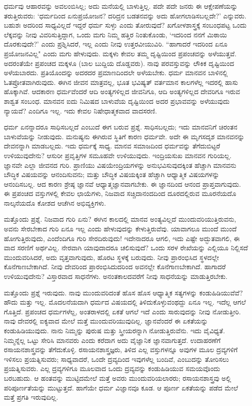 ಧರ್ಮವು ಆಹಾರವನ್ನು ಅವಲಂಬಿಸಿಲ್ಲ; ಅದು ಮನೆಯಲ್ಲಿ ಬಾಳುತ್ತಿಲ್ಲ. ಪದೇ ಪದೇ ಜನರು ಈ ಆಕ್ಷೇಪಣೆಯನ್ನು ತರುತ್ತಿರುವರು: `ಧರ್ಮದಿಂದ ಏನು\break ಪ್ರಯೋಜನ? ದರಿದ್ರನ ಬಡತನವನ್ನು ಅದು ಹೋಗಲಾಡಿಸಬಲ್ಲದೇ?' ಎನ್ನುವರು. ಬಹುಶಃ ಅದರಿಂದ ಸಾಧ್ಯವಿಲ್ಲದೆ ಇದ್ದರೆ ಧರ್ಮ ಸುಳ್ಳು ಎಂದು ತೋರುವುದೆ? ಖಗೋಳಶಾಸ್ತ್ರಕ್ಕೆ ಸಂಬಂಧಪಟ್ಟ ಒಂದು ಲೆಕ್ಕವನ್ನು ನೀವು ವಿವರಿಸುತ್ತಿದ್ದಾಗ, ಒಂದು ಮಗು ನಿಮ್ಮ ಹತ್ತಿರ ನಿಂತುಕೊಂಡು, `ಇದರಿಂದ ನನಗೆ ಮಿಠಾಯಿ ದೊರಕುವುದೇ?' ಎಂದು ಪ್ರಶ್ನಿಸಿದರೆ, ಇಲ್ಲ ಎಂದು ನೀವು ಉತ್ತರವೀಯುವಿರಿ. “ಹಾಗಾದರೆ ಇದರಿಂದ ಏನೂ ಪ್ರಯೋಜನವಿಲ್ಲ" ಎಂದು ಮಗು ಹೇಳುವುದು. ಮಕ್ಕಳು ಕೇವಲ ತಮ್ಮ ದೃಷ್ಟಿಯಿಂದ ಪ್ರಪಂಚವನ್ನು ಅಳೆಯುತ್ತವೆ. ಅದರಂತೆಯೇ ಪ್ರಪಂಚದ ಮಕ್ಕಳೂ (ಬಾಲ ಬುದ್ದಿಯ ದೊಡ್ಡವರು). ನಾವು ಪರವಸ್ತುವನ್ನು ಲೌಕಿಕ ದೃಷ್ಟಿಯಿಂದ ಅಳೆಯಬಾರದು. ಪ್ರತಿಯೊಂದನ್ನು ಅದರದರ ಪ್ರಮಾಣದಿಂದಲೇ ಅಳೆಯಬೇಕು. ಧರ್ಮ ಮಾನವನ ಬಾಳಿನಲ್ಲಿ ಓತಪ್ರೋತವಾಗಿರುವುದು. ಈಗಿನ ಜೀವನ ಮಾತ್ರವಲ್ಲ, ಭೂತ ಭವಿಷ್ಯತ್ ವರ್ತಮಾನ ಕಾಲಗಳೆಲ್ಲ ಇದರಲ್ಲಿ ಹಾಸು ಹೊಕ್ಕಾಗಿವೆ. ಆದಕಾರಣ ಧರ್ಮವೆಂದರೆ ಆದಿ ಅಂತ್ಯಗಳಿಲ್ಲದ ಜೀವನಿಗೂ, ಆದಿ ಅಂತ್ಯಗಳಿಲ್ಲದ ದೇವರಿಗೂ ಇರುವ ಶಾಶ್ವತ ಸಂಬಂಧ. ಮಾನವನ ಐದು ನಿಮಿಷದ ಬಾಳುವೆಯ ದೃಷ್ಟಿಯಿಂದ ಅದರ ಪ್ರಭಾವವನ್ನು ಅಳೆಯುವುದು ನ್ಯಾಯವೆ? ಎಂದಿಗೂ ಇಲ್ಲ. ಇದು ಕೇವಲ ನಿಷೇಧಾತ್ಮಕವಾದ ವಾದಸರಣಿ.

ಧರ್ಮ ಏನನ್ನಾದರೂ ಸಾಧಿಸಬಲ್ಲದೆ ಎಂಬುದೆ ಈಗ ಬರುವ ಪ್ರಶ್ನೆ. ಸಾಧಿಸಬಲ್ಲದು; ಇದು ಮಾನವನಿಗೆ ಚಿರಂತನ ಬಾಳುವೆಯನ್ನು ನೀಡುವುದು. ಮನುಷ್ಯನು ಈಗಿರುವ ಸ್ಥಿತಿಗೆ ಕಾರಣ ಧರ್ಮವೇ. ಅದೇ ಈ ಮೃಗಸದೃಶ ಮಾನವನನ್ನು ದೇವನನ್ನಾಗಿ ಮಾಡಬಲ್ಲದು. ಇದು ಧರ್ಮಕ್ಕೆ ಸಾಧ್ಯ. ಮಾನವ ಸಮಾಜದಿಂದ ಧರ್ಮವನ್ನು ತೆಗೆದುಬಿಟ್ಟರೆ ಉಳಿಯುವುದೇನು? ಆಸುರೀ ಪ್ರವೃತ್ತಿಗಳ ಸಮೂಹವೇ ಉಳಿಯುವುದು. ಇಂದ್ರಿಯಸುಖ ಮಾನವನ ಗುರಿಯಲ್ಲ. ಜ್ಞಾನವೇ ಎಲ್ಲಾ ಜೀವನದ ಗುರಿ. ಪ್ರಾಣಿಯು ವಿಷಯೇಂದ್ರಿಯಗಳನ್ನು ಅನುಭವಿಸುವುದಕ್ಕಿಂತ ಹೆಚ್ಚಾಗಿ ಮಾನವನು ಬೌದ್ಧಿಕ ವಿಷಯವನ್ನು ಆನಂದಿಸುವನು; ಮತ್ತು ಬೌದ್ಧಿಕ ವಿಷಯಕ್ಕಿಂತ ಹೆಚ್ಚಾಗಿ ಆಧ್ಯಾತ್ಮಿಕ ವಿಷಯಗಳನ್ನು ಆನಂದಿಸಬಲ್ಲ. ಆದ ಕಾರಣ ಶ್ರೇಷ್ಠ ಜ್ಞಾನವೆ ಆಧ್ಯಾತ್ಮಜ್ಞಾನವಾಗಬೇಕು. ಈ ಜ್ಞಾನದಿಂದ ಆನಂದ ಪ್ರಾಪ್ತವಾಗುವುದು. ಈ ಪ್ರಪಂಚದ ವಸ್ತುಗಳಲ್ಲಿ ಕೇವಲ ಛಾಯೆಗಳು, ನಿಜವಾದ ಸಚ್ಚಿದಾನಂದದಿಂದ ದೂರದಲ್ಲಿರುವ ಮೂರನೆಯದೊ ನಾಲ್ಕನೆಯದೊ ಕೋಶದ ಆಚೆಗಿನ ಅಭಿವ್ಯಕ್ತಿಗಳು.

ಮತ್ತೊಂದು ಪ್ರಶ್ನೆ. ನಿಜವಾದ ಗುರಿ ಏನು? ಈಗಿನ ಕಾಲದಲ್ಲಿ ಮಾನವ ಅಂತ್ಯವಿಲ್ಲದೆ ಮುಂದುವರಿಯುತ್ತಿರುವನು, ಅವನು ಸೇರಬೇಕಾದ ಗುರಿ ಏನೂ ಇಲ್ಲ ಎಂದು ಹೇಳುವುದನ್ನು ಕೇಳುತ್ತಿರುವೆವು. ಯಾವಾಗಲೂ ಮುಂದೆ ಮುಂದೆ ಹೋಗುತ್ತಿರುವುದು, ಎಂದೆಂದಿಗೂ ಗುರಿ ಸೇರದಿರುವುದು! ಇದೇನಾದರೂ ಆಗಲಿ, ಇದು ಎಷ್ಟೇ ಅದ್ಭುತವಾಗಲಿ, ಈ ವಾದ ಸರಣಿಗೆ ಅರ್ಥವಿಲ್ಲ. ನೇರವಾಗಿ ಯಾವುದಾದರೂ ಚಲಿಸುವುದೆ? ಒಂದು ಸರಳ ರೇಖೆಯನ್ನು ಎಲ್ಲಿಯೂ ನಿಲ್ಲಿಸದೆ ಮುಂದುವರಿಸಿದರೆ, ಅದು ವೃತ್ತವಾಗುವುದು, ಹೊರಟ ಸ್ಥಳಕ್ಕೆ ಬರುವುದು. ನೀವು ಪ್ರಾರಂಭಿಸಿದ ಸ್ಥಳದಲ್ಲೇ ಕೊನೆಗಾಣಬೇಕಾಗಿದೆ. ನೀವು ದೇವರಿಂದ ಪ್ರಾರಂಭಿಸಿದುದರಿಂದ ಅವನಲ್ಲೇ ಕೊನೆಗಾಣಬೇಕಾಗಿದೆ. ಹಾಗಾದರೆ ಉಳಿಯುವುದೇನು? ವಿಸ್ತಾರವಾದ ಸಾಧನೆಗಳು. ಅನಂತಕಾಲದವರೆಗೆ ನೀವು ಸಾಧನೆಯನ್ನು ಮಾಡುತ್ತಿರಬೇಕು.

ಮತ್ತೊಂದು ಪ್ರಶ್ನೆ ಇರುವುದು. ನಾವು ಮುಂದುವರಿದಂತೆ ಹೊಸ ಹೊಸ ಆಧ್ಯಾತ್ಮಿಕ ಸತ್ಯಗಳನ್ನು ಕಂಡುಹಿಡಿಯುವೆವೆ? ಹೌದು ಮತ್ತು ಇಲ್ಲ. ಮೊದಲನೆಯದಾಗಿ ಧರ್ಮದ ವಿಷಯದಲ್ಲಿ ತಿಳಿದುಕೊಳ್ಳುವಂಥದ್ದು ಏನೂ ಇಲ್ಲ. ಇದೆಲ್ಲ ಆಗಲೆ ಗೊತ್ತಿದೆ. ಪ್ರಪಂಚದ ಧರ್ಮಗಳೆಲ್ಲ, ಅಂತರಾಳದಲ್ಲಿ ಏಕತೆ ಆಗಲೆ ಇದೆ ಎಂದು ಸಾರುವುದನ್ನು ನೀವು ನೋಡುತ್ತೀರಿ. ನಾವು ದೇವರಲ್ಲಿ ಐಕ್ಯವಾದ ಮೇಲೆ ಮತ್ತೆ ಮುಂದುವರಿಯುವುದಿಲ್ಲ. ಜ್ಞಾನವೆಂದರೆ ಈ ಏಕತೆಯನ್ನು ಕಂಡುಹಿಡಿಯುವುದು. ನಾನು ನಿಮ್ಮನ್ನು ಪುರುಷ ಮತ್ತು ಸ್ತ್ರೀಯರನ್ನಾಗಿ ನೋಡುತ್ತಿರುವೆನು. ಇದು ವೈವಿಧ್ಯತೆ. ನಿಮ್ಮನ್ನೆಲ್ಲ ಒಟ್ಟು ಸೇರಿಸಿ ಮಾನವರು ಎಂದು ಕರೆದಾಗ ಅದು ವೈಜ್ಞಾನಿಕ ಜ್ಞಾನವಾಗುತ್ತದೆ. ಉದಾಹರಣೆಗೆ ರಸಾಯನಶಾಸ್ತ್ರವನ್ನು ತೆಗೆದುಕೊಳ್ಳಿ. ರಸಾಯನಶಾಸ್ತ್ರಜ್ಞರು, ತಿಳಿದ ಎಲ್ಲ ವಸ್ತುಗಳನ್ನೂ ಅವುಗಳ ಮೂಲ ದ್ರವ್ಯಗಳಿಗೆ ಇಳಿಸಲು ಪ್ರಯತ್ನಿಸುವರು; ಸಾಧ್ಯವಾದರೆ, ಒಂದೇ ದ್ರವ್ಯದಿಂದ ಇವುಗಳೆಲ್ಲ ಬಂದಿವೆ, ಎಂಬುದನ್ನು ತೋರಿಸಲು ಪ್ರಯತ್ನಿಸುವರು. ಎಲ್ಲ ದ್ರವ್ಯಗಳಿಗೂ ಮೂಲವಾದ ಒಂದು ದ್ರವ್ಯವನ್ನು ಕಂಡುಹಿಡಿಯುವ ಸಮಯವೊಂದು ಬರಬಹುದು. ಆ ಹಂತವನ್ನು ಮುಟ್ಟಿದಮೇಲೆ ಮತ್ತೆ ಅವರು ಮುಂದುವರಿಯಲಾರರು; ರಸಾಯನಶಾಸ್ತ್ರವು ಅಲ್ಲಿ ಪರಿಪೂರ್ಣತೆಯನ್ನು ಮುಟ್ಟುತ್ತದೆ. ಹಾಗೆಯೇ ಧರ್ಮ ವಿಜ್ಞಾನವೂ ಕೂಡ. ಆ ಪೂರ್ಣ ಏಕತೆಯನ್ನು ಪಡೆದ ಮೇಲೆ ಮತ್ತೆ ಪ್ರಗತಿ ಇರುವುದಿಲ್ಲ.

